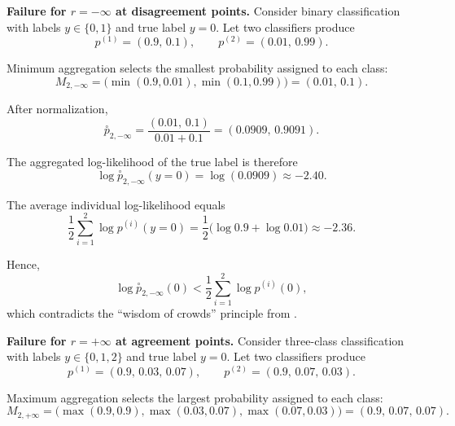 \documentclass[accepted]{uai2026} %
\newcommand{\compose}[1]{\overset{\circ}{#1}}
\begin{document}
\textbf{Failure for $r=-\infty$ at disagreement points. }Consider binary classification with labels
$y \in \{0,1\}$ and true label $y=0$.
Let two classifiers produce
\begin{equation}
p^{(1)} = (0.9,\,0.1),
\qquad
p^{(2)} = (0.01,\,0.99).
\end{equation}

Minimum aggregation selects the smallest probability assigned
to each class:
\begin{equation}
M_{2,-\infty}
=
\big(
\min(0.9,0.01),
\min(0.1,0.99)
\big)
=
(0.01,\,0.1).
\end{equation}

After normalization,
\begin{equation}
\compose{p}_{2,-\infty}
=\frac{(0.01,\,0.1)}{0.01+0.1} = (0.0909,\,0.9091).
\end{equation}

The aggregated log-likelihood of the true label is therefore
\begin{equation}
\log \compose{p}_{2,-\infty}(y=0)
= \log(0.0909)
\approx -2.40.
\end{equation}

The average individual log-likelihood equals
\begin{equation}
\frac{1}{2}
\sum_{i=1}^{2}
\log p^{(i)}(y=0)
=
\frac{1}{2}
\big(
\log 0.9 + \log 0.01
\big)
\approx -2.36.
\end{equation}

Hence,
\begin{equation}
\log \compose{p}_{2,-\infty}(0)
<
\frac{1}{2}
\sum_{i=1}^{2}
\log p^{(i)}(0),
\end{equation}
which contradicts the ``wisdom of crowds'' principle from .

\textbf{Failure for $r=+\infty$ at agreement points. }
Consider three-class classification with labels
$y \in \{0,1,2\}$ and true label $y=0$.
Let two classifiers produce
\begin{equation}
p^{(1)} = (0.9,\,0.03,\,0.07),
\qquad
p^{(2)} = (0.9,\,0.07,\,0.03).
\end{equation}

Maximum aggregation selects the largest probability assigned
to each class:
\begin{equation}
M_{2,+\infty}
=
\big(
\max(0.9,0.9),
\max(0.03,0.07),
\max(0.07,0.03)
\big)
=
(0.9,\,0.07,\,0.07).
\end{equation}
\end{document}
